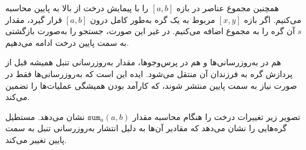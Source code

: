 \begin{center}
\end{center}

همچنین مجموع عناصر در بازه $[a,b]$ را با پیمایش درخت از بالا به پایین محاسبه می‌کنیم.
اگر بازه $[x,y]$ مربوط به یک گره به‌طور کامل درون $[a,b]$ قرار گیرد، مقدار $s$ آن گره را به مجموع اضافه می‌کنیم.
در غیر این صورت، جستجو را به‌صورت بازگشتی به سمت پایین درخت ادامه می‌دهیم.

هم در به‌روزرسانی‌ها و هم در پرس‌وجوها،
مقدار به‌روزرسانی تنبل همیشه قبل از پردازش گره
به فرزندان آن منتقل می‌شود.
ایده این است که به‌روزرسانی‌ها فقط در صورت نیاز
به سمت پایین منتشر شوند،
که کارآمد بودن همیشگی عملیات‌ها را تضمین می‌کند.

تصویر زیر تغییرات درخت را هنگام محاسبه مقدار $\texttt{sum}_a(a,b)$ نشان می‌دهد.
مستطیل گره‌هایی را نشان می‌دهد که مقادیر آن‌ها به دلیل انتشار به‌روزرسانی تنبل به سمت پایین تغییر می‌کند.

